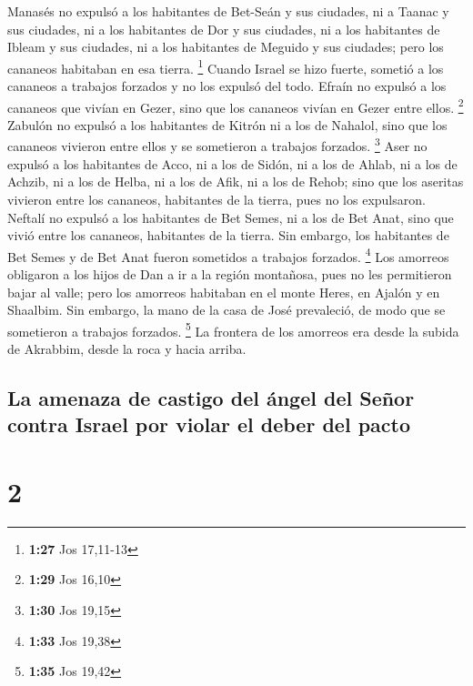  Manasés no expulsó a los habitantes de Bet-Seán y sus
ciudades, ni a Taanac y sus ciudades, ni a los habitantes de Dor y sus
ciudades, ni a los habitantes de Ibleam y sus ciudades, ni a los
habitantes de Meguido y sus ciudades; pero los cananeos habitaban en esa
tierra. \footnote{\textbf{1:27} Jos 17,11-13}  Cuando
Israel se hizo fuerte, sometió a los cananeos a trabajos forzados y no
los expulsó del todo.  Efraín no expulsó a los cananeos
que vivían en Gezer, sino que los cananeos vivían en Gezer entre ellos.
\footnote{\textbf{1:29} Jos 16,10}  Zabulón no expulsó a
los habitantes de Kitrón ni a los de Nahalol, sino que los cananeos
vivieron entre ellos y se sometieron a trabajos forzados. \footnote{\textbf{1:30}
  Jos 19,15}  Aser no expulsó a los habitantes de Acco,
ni a los de Sidón, ni a los de Ahlab, ni a los de Achzib, ni a los de
Helba, ni a los de Afik, ni a los de Rehob;  sino que los
aseritas vivieron entre los cananeos, habitantes de la tierra, pues no
los expulsaron.  Neftalí no expulsó a los habitantes de
Bet Semes, ni a los de Bet Anat, sino que vivió entre los cananeos,
habitantes de la tierra. Sin embargo, los habitantes de Bet Semes y de
Bet Anat fueron sometidos a trabajos forzados. \footnote{\textbf{1:33}
  Jos 19,38}  Los amorreos obligaron a los hijos de Dan a
ir a la región montañosa, pues no les permitieron bajar al valle;
 pero los amorreos habitaban en el monte Heres, en Ajalón
y en Shaalbim. Sin embargo, la mano de la casa de José prevaleció, de
modo que se sometieron a trabajos forzados. \footnote{\textbf{1:35} Jos
  19,42}  La frontera de los amorreos era desde la subida
de Akrabbim, desde la roca y hacia arriba.

\hypertarget{la-amenaza-de-castigo-del-uxe1ngel-del-seuxf1or-contra-israel-por-violar-el-deber-del-pacto}{%
\subsection{La amenaza de castigo del ángel del Señor contra Israel por
violar el deber del
pacto}\label{la-amenaza-de-castigo-del-uxe1ngel-del-seuxf1or-contra-israel-por-violar-el-deber-del-pacto}}

\hypertarget{section-1}{%
\section{2}\label{section-1}}

